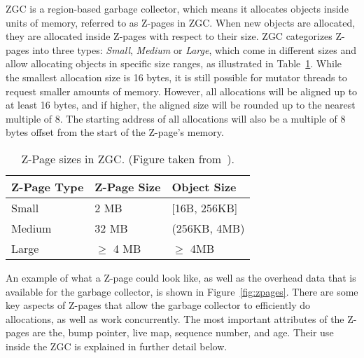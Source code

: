 ZGC is a region-based garbage collector, which means it allocates objects inside units of memory, referred to as Z-pages in ZGC. When new objects are allocated, they are allocated inside Z-pages with respect to their size. ZGC categorizes Z-pages into three types: \textit{Small}, \textit{Medium} or \textit{Large}, which come in different sizes and allow allocating objects in specific size ranges, as illustrated in Table~\ref{table:zpage_sizes}. While the smallest allocation size is 16 bytes, it is still possible for mutator threads to request smaller amounts of memory. However, all allocations will be aligned up to at least 16 bytes, and if higher, the aligned size will be rounded up to the nearest multiple of 8. The starting address of all allocations will also be a multiple of 8 bytes offset from the start of the Z-page's memory.

\begin{table}[H]
    \centering
    \begin{tabular}{lllll}
        \hline
        Z-Page Type & Z-Page Size          & \multicolumn{3}{l}{Object Size}        \\ \hline
        Small     & 2 MB                & \multicolumn{3}{l}{{[}16B, 256KB{]}}   \\
        Medium    & 32 MB               & \multicolumn{3}{l}{(256KB, 4MB)}       \\
        Large     & $\geq$ 4 MB & \multicolumn{3}{l}{$\geq$ 4MB} \\ \hline
    \end{tabular}
    \caption{Z-Page sizes in ZGC. (Figure taken from~\cite{zpage_size_table}). }
    \label{table:zpage_sizes}
\end{table}

An example of what a Z-page could look like, as well as the overhead data that is available for the garbage collector, is shown in Figure~\ref{fig:zpages}. There are some key aspects of Z-pages that allow the garbage collector to efficiently do allocations, as well as work concurrently. The most important attributes of the Z-pages are the, bump pointer, live map, sequence number, and age. Their use inside the ZGC is explained in further detail below.


